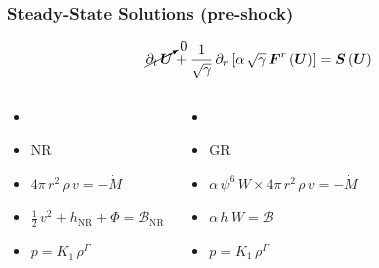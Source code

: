 \documentclass{beamer}
\newcommand{\p}{\partial}
\newcommand{\bs}{\boldsymbol}
\newcommand{\nr}{\mathrm{NR}}
\newcommand{\mdot}{\dot{M}}
\begin{document}
\begin{frame}
\frametitle{Steady-State Solutions (pre-shock)}

  \begin{equation*}
    \cancelto{0}{\p_{t}\,\bs{U}}
    +\frac{1}{\sqrt{\gamma}}\,
    \p_{r}\left[\alpha\,\sqrt{\gamma}\,\bs{F}^{r}\left(\bs{U}\right)\right]
    =\bs{S}\left(\bs{U}\right)
  \end{equation*}

  \begin{columns}[c]


    \begin{itemize}[<+->]
      \item[]
      \item[]
        NR
      \item[]
        $4\pi\,r^{2}\,\rho\,v=-\mdot$
      \item[]
        $\frac{1}{2}\,v^{2}+h_{\nr}+\Phi=\mathcal{B}_{\nr}$
      \item[]
        $p=K_{1}\,\rho^{\Gamma}$
    \end{itemize}


    \begin{itemize}[<+->]
      \item[]
      \item[]
        GR
      \item[]
        $\alpha\,\psi^{6}\,W\times4\pi\,r^{2}\,\rho\,v=-\mdot$
      \item[]
        $\alpha\,h\,W=\mathcal{B}$
      \item[]
        $p=K_{1}\,\rho^{\Gamma}$
    \end{itemize}

  \end{columns}

\end{frame}
\end{document}
